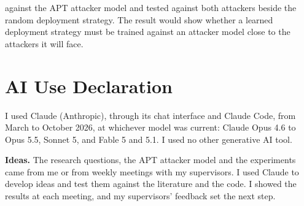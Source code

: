 \documentclass{cshonours}
\begin{document}
\begin{itemize}
  against the APT attacker model and tested against both attackers beside the
  random deployment strategy. The result would show whether a learned
  deployment strategy must be trained against an attacker model close to the
  attackers it will face.
\end{itemize}



\chapter*{AI Use Declaration}
\label{ch:ai-declaration}%

I used Claude (Anthropic), through its chat interface and Claude Code, from
March to October 2026, at whichever model was current: Claude Opus 4.6 to
Opus 5.5, Sonnet 5, and Fable 5 and 5.1. I used no other generative AI tool.

\textbf{Ideas.} The research questions, the APT attacker model and the
experiments came from me or from weekly meetings with my supervisors. I used
Claude to develop ideas and test them against the literature and the code. I
showed the results at each meeting, and my supervisors' feedback set the next
step.
\end{document}
